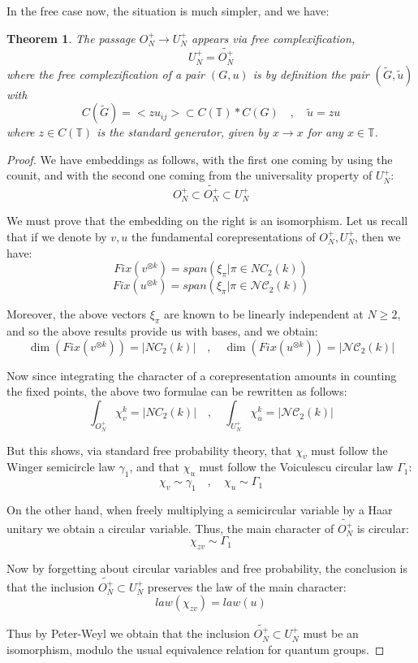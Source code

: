 \documentclass[12pt]{amsbook}
\newtheorem{theorem}{Theorem}[chapter]
\begin{document}
In the free case now, the situation is much simpler, and we have:

\begin{theorem}
The passage $O_N^+\to U_N^+$ appears via free complexification,
$$U_N^+=\widetilde{O_N^+}$$
where the free complexification of a pair $(G,u)$ is by definition the pair $(\widetilde{G},\widetilde{u})$ with
$$C(\widetilde{G})=<zu_{ij}>\subset C(\mathbb T)*C(G)\quad,\quad 
\widetilde{u}=zu$$
where $z\in C(\mathbb T)$ is the standard generator, given by $x\to x$ for any $x\in\mathbb T$.
\end{theorem}

\begin{proof}
We have embeddings as follows, with the first one coming by using the counit, and with the second one coming from the universality property of $U_N^+$:
$$O_N^+
\subset\widetilde{O_N^+}
\subset U_N^+$$

We must prove that the embedding on the right is an isomorphism. Let us recall that if we denote by $v,u$ the fundamental corepresentations of $O_N^+,U_N^+$, then we have:
$$Fix(v^{\otimes k})=span\left(\xi_\pi\Big|\pi\in NC_2(k)\right)$$
$$Fix(u^{\otimes k})=span\left(\xi_\pi\Big|\pi\in\mathcal{NC}_2(k)\right)$$

Moreover, the above vectors $\xi_\pi$ are known to be linearly independent at $N\geq2$, and so the above results provide us with bases, and we obtain:
$$\dim(Fix(v^{\otimes k}))=|NC_2(k)|\quad,\quad 
\dim(Fix(u^{\otimes k}))=|\mathcal{NC}_2(k)|$$ 

Now since integrating the character of a corepresentation amounts in counting the fixed points, the above two formulae can be rewritten as follows:
$$\int_{O_N^+}\chi_v^k=|NC_2(k)|\quad,\quad 
\int_{U_N^+}\chi_u^k=|\mathcal{NC}_2(k)|$$ 

But this shows, via standard free probability theory, that $\chi_v$ must follow the Winger semicircle law $\gamma_1$, and that $\chi_u$ must follow the Voiculescu circular law $\Gamma_1$:
$$\chi_v\sim\gamma_1\quad,\quad 
\chi_u\sim\Gamma_1$$

On the other hand, when freely multiplying a semicircular variable by a Haar unitary we obtain a circular variable. Thus, the main character of $\widetilde{O_N^+}$ is circular:
$$\chi_{zv}\sim\Gamma_1$$

Now by forgetting about circular variables and free probability, the conclusion is that the inclusion $\widetilde{O_N^+}\subset U_N^+$ preserves the law of the main character:
$$law(\chi_{zv})=law(u)$$

Thus by Peter-Weyl we obtain that the inclusion $\widetilde{O_N^+}\subset U_N^+$ must be an isomorphism, modulo the usual equivalence relation for quantum groups.
\end{proof}
\end{document}
